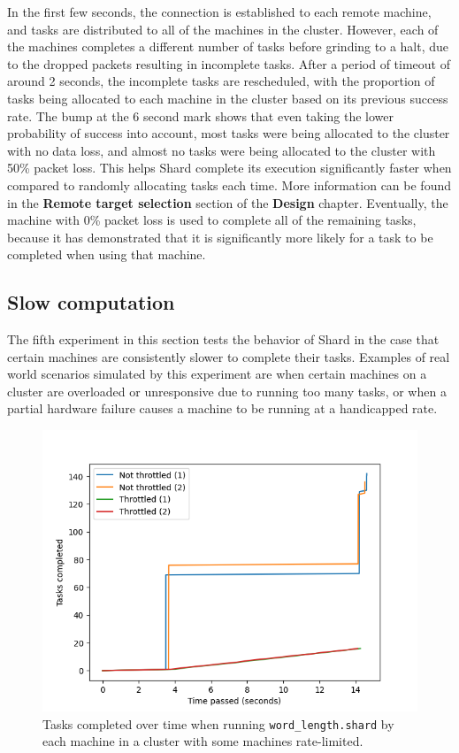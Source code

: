 \documentclass[twoside]{report}
\begin{document}
In the first few seconds, the connection is established to each remote machine, and tasks are distributed to all of the machines in the cluster.
However, each of the machines completes a different number of tasks before grinding to a halt, due to the dropped packets resulting in incomplete tasks.
After a period of timeout of around 2 seconds, the incomplete tasks are rescheduled, with the proportion of tasks being allocated to each machine in the cluster based on its previous success rate.
The bump at the 6 second mark shows that even taking the lower probability of success into account, most tasks were being allocated to the cluster with no data loss, and almost no tasks were being allocated to the cluster with 50\% packet loss.
This helps Shard complete its execution significantly faster when compared to randomly allocating tasks each time.
More information can be found in the \textbf{Remote target selection} section of the \textbf{Design} chapter.
Eventually, the machine with 0\% packet loss is used to complete all of the remaining tasks, because it has demonstrated that it is significantly more likely for a task to be completed when using that machine.

\subsection{Slow computation}
The fifth experiment in this section tests the behavior of Shard in the case that certain machines are consistently slower to complete their tasks.
Examples of real world scenarios simulated by this experiment are when certain machines on a cluster are overloaded or unresponsive due to running too many tasks, or when a partial hardware failure causes a machine to be running at a handicapped rate.

\begin{figure}[h]
  \begin{center}
    \includegraphics[scale=0.9]{img/experiments/e11_1620960581241.png}
    \caption{Tasks completed over time when running \texttt{word\_length.shard} by each machine in a cluster with some machines rate-limited.}
    \label{fig:slowwordlength}
  \end{center}
\end{figure}
\end{document}
